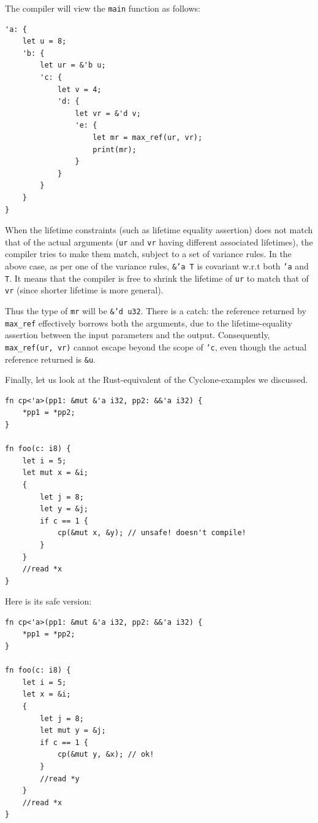 \documentclass[11pt]{report}
\begin{document}
The compiler will view the \texttt{main} function as follows:

\begin{lstlisting}
'a: {
    let u = 8;
    'b: {
        let ur = &'b u;
        'c: {
            let v = 4;
            'd: {
                let vr = &'d v;
                'e: {
                    let mr = max_ref(ur, vr);
                    print(mr);
                }
            }
        }
    }
}
\end{lstlisting}

When the lifetime constraints (such as lifetime equality assertion) does not match that of the actual arguments (\texttt{ur} and \texttt{vr} having different associated lifetimes), the compiler tries to make them match, subject to a set of variance rules. In the above case, as per one of the variance rules, \texttt{\&'a T} is covariant w.r.t both \texttt{'a} and \texttt{T}. It means that the compiler is free to shrink the lifetime of \texttt{ur} to match that of \texttt{vr} (since shorter lifetime is more general).

Thus the type of \texttt{mr} will be \texttt{\&'d u32}. There is a catch: the reference returned by \texttt{max\_ref} effectively borrows both the arguments, due to the lifetime-equality assertion between the input parameters and the output. Consequently, \texttt{max\_ref(ur, vr)} cannot escape beyond the scope of \texttt{'c}, even though the actual reference returned is \texttt{\&u}.

Finally, let us look at the Rust-equivalent of the Cyclone-examples we discussed.

\begin{lstlisting}
fn cp<'a>(pp1: &mut &'a i32, pp2: &&'a i32) {
    *pp1 = *pp2;
}

fn foo(c: i8) {
    let i = 5;
    let mut x = &i;
    {
        let j = 8;
        let y = &j;
        if c == 1 {
            cp(&mut x, &y); // unsafe! doesn't compile!
        }
    }
    //read *x
}
\end{lstlisting}

\noindent Here is its safe version:

\begin{lstlisting}
fn cp<'a>(pp1: &mut &'a i32, pp2: &&'a i32) {
    *pp1 = *pp2;
}

fn foo(c: i8) {
    let i = 5;
    let x = &i;
    {
        let j = 8;
        let mut y = &j;
        if c == 1 {
            cp(&mut y, &x); // ok!
        }
        //read *y
    }
    //read *x
}
\end{lstlisting}
\end{document}
